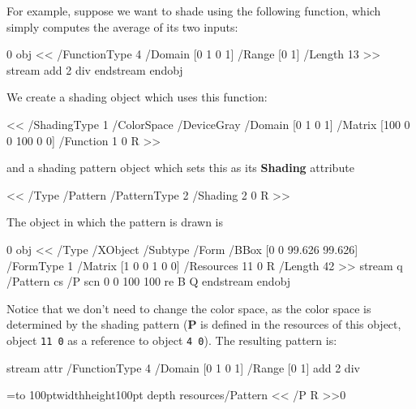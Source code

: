 For example, suppose we want to shade using the following function, which simply computes the average of its
two inputs:

 0 obj
<<
    /FunctionType 4
    /Domain [0 1 0 1]
    /Range [0 1] 
    /Length 13        
>>
stream
{
    add
    2 div
}
endstream
endobj
\elisting

\noindent We create a shading object which uses this function:

\blisting
<<
    /ShadingType 1              %
    /ColorSpace /DeviceGray     %
    /Domain [0 1 0 1]           %
    /Matrix [100 0 0 100 0 0]   %
    /Function 1 0 R             %
>> 
\elisting

\noindent and a shading pattern object which sets this as its {\bf Shading} attribute

\blisting
<<
    /Type /Pattern  %
    /PatternType 2  %
    /Shading 2 0 R  %
>> 
\elisting

\noindent The object in which the pattern is drawn is

 0 obj
<<
    /Type /XObject
    /Subtype /Form
    /BBox [0 0 99.626 99.626]
    /FormType 1
    /Matrix [1 0 0 1 0 0]
    /Resources 11 0 R
    /Length 42        
>>
stream
q
/Pattern cs     %
/P scn          %
0 0 100 100 re  %
B               %
Q 
endstream
endobj
\elisting

\noindent Notice that we don't need to change the color space, as the color space is determined by the
shading pattern ({\bf P} is defined in the resources of this object, object {\tt11 0} as a reference to object
{\tt4 0}).
The resulting pattern is:

\bgroup
\immediate\pdfobj stream attr{
    /FunctionType 4
    /Domain [0 1 0 1]
    /Range [0 1]
}{{
    add
    2 div
}}

\immediate{}

\immediate{}

=\hbox to 100pt{\vrule width\z@ height100pt depth\z@%
    \hfil%
}
\pdfxform resources{/Pattern << /P \the\pdflastobj{} R >>}0

